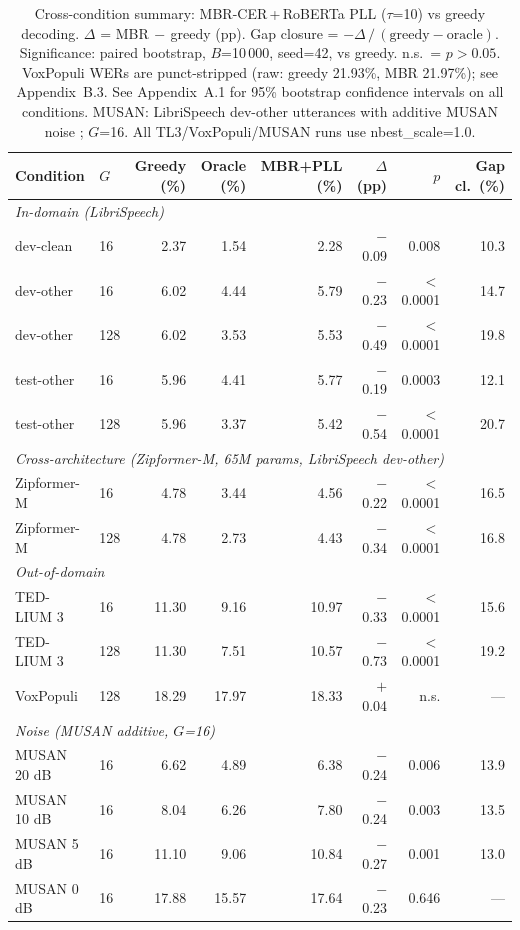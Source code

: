 \begin{table}[t]
\centering
\caption{Cross-condition summary: MBR-CER\,+\,RoBERTa PLL ($\tau$=10) vs greedy decoding.
$\Delta$ = MBR$\,-\,$greedy (pp). Gap closure = $-\Delta\,/\,(\text{greedy}-\text{oracle})$.
Significance: paired bootstrap, $B$=10\,000, seed=42, vs greedy. n.s.\ = $p>0.05$.
VoxPopuli WERs are punct-stripped (raw: greedy 21.93\%, MBR 21.97\%); see Appendix~B.3.
See Appendix~A.1 for 95\% bootstrap confidence intervals on all conditions.
MUSAN: LibriSpeech dev-other utterances with additive MUSAN noise
\cite{snyder2015musan}; $G$=16. All TL3/VoxPopuli/MUSAN runs use nbest\_scale=1.0.}
\label{tab:cross-condition}
\begin{tabular}{llrrrrrr}
\hline
Condition & $G$ & Greedy (\%) & Oracle (\%) & MBR+PLL (\%) & $\Delta$ (pp) & $p$ & Gap cl.\ (\%) \\
\hline
\multicolumn{8}{l}{\textit{In-domain (LibriSpeech)}} \\
dev-clean  & 16  & 2.37 & 1.54 & 2.28 & $-$0.09 & 0.008      & 10.3 \\
dev-other  & 16  & 6.02 & 4.44 & 5.79 & $-$0.23 & $<$0.0001  & 14.7 \\
dev-other  & 128 & 6.02 & 3.53 & 5.53 & $-$0.49 & $<$0.0001  & 19.8 \\
test-other & 16  & 5.96 & 4.41 & 5.77 & $-$0.19 & 0.0003     & 12.1 \\
test-other & 128 & 5.96 & 3.37 & 5.42 & $-$0.54 & $<$0.0001  & 20.7 \\
\hline
\multicolumn{8}{l}{\textit{Cross-architecture (Zipformer-M, 65M params, LibriSpeech dev-other)}} \\
Zipformer-M & 16  & 4.78 & 3.44 & 4.56 & $-$0.22 & $<$0.0001 & 16.5 \\
Zipformer-M & 128 & 4.78 & 2.73 & 4.43 & $-$0.34 & $<$0.0001 & 16.8 \\
\hline
\multicolumn{8}{l}{\textit{Out-of-domain}} \\
TED-LIUM 3 & 16  & 11.30 & 9.16 & 10.97 & $-$0.33 & $<$0.0001 & 15.6 \\
TED-LIUM 3 & 128 & 11.30 & 7.51 & 10.57 & $-$0.73 & $<$0.0001 & 19.2 \\
VoxPopuli  & 128 & 18.29 & 17.97 & 18.33 & $+$0.04 & n.s.      & ---  \\
\hline
\multicolumn{8}{l}{\textit{Noise (MUSAN additive, $G$=16)}} \\
MUSAN 20 dB & 16 & 6.62 & 4.89 & 6.38 & $-$0.24 & 0.006  & 13.9 \\
MUSAN 10 dB & 16 & 8.04 & 6.26 & 7.80 & $-$0.24 & 0.003  & 13.5 \\
MUSAN 5 dB  & 16 & 11.10 & 9.06 & 10.84 & $-$0.27 & 0.001 & 13.0 \\
MUSAN 0 dB  & 16 & 17.88 & 15.57 & 17.64 & $-$0.23 & 0.646 & --- \\
\hline
\end{tabular}
\end{table}

